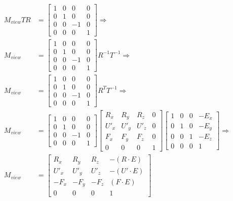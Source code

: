 \begin{equation}
  \begin{aligned}
    M_{view}TR &=   \begin{bmatrix}
      1 & 0 & 0 & 0 \\
      0 & 1 & 0 & 0 \\
      0 & 0 & -1 & 0 \\
      0 & 0 & 0 & 1
      \end{bmatrix}  
      \Rightarrow \\ 
    M_{view} &= \begin{bmatrix}
        1 & 0 & 0 & 0 \\
        0 & 1 & 0 & 0 \\
        0 & 0 & -1 & 0 \\
        0 & 0 & 0 & 1
        \end{bmatrix} R^{-1}T^{-1} 
        \Rightarrow \\ 
    M_{view} &= \begin{bmatrix}
          1 & 0 & 0 & 0 \\
          0 & 1 & 0 & 0 \\
          0 & 0 & -1 & 0 \\
          0 & 0 & 0 & 1
          \end{bmatrix} R^{T}T^{-1} 
          \Rightarrow \\ 
    M_{view} &= \begin{bmatrix}
            1 & 0 & 0 & 0 \\
            0 & 1 & 0 & 0 \\
            0 & 0 & -1 & 0 \\
            0 & 0 & 0 & 1
            \end{bmatrix}  
            \begin{bmatrix}
              R_x & R_y & R_z & 0 \\
              U'_x & U'_y & U'_z & 0 \\
              F_x & F_y & F_z & 0 \\
              0   & 0   & 0   & 1
              \end{bmatrix}  
            \begin{bmatrix}
                1 & 0 & 0 & -E_x \\
                0 & 1 & 0 & -E_y \\
                0 & 0 & 1 & -E_z \\
                0   & 0   & 0   & 1
                \end{bmatrix}  
                \Rightarrow \\ 
    M_{view} &= \begin{bmatrix}
                  R_x & R_y & R_z & -(R \cdot E) \\
                  U'_x & U'_y & U'_z & -(U' \cdot E) \\
                  -F_x & -F_y & -F_z & (F \cdot E) \\
                  0   & 0   & 0   & 1
                  \end{bmatrix}
  \end{aligned}
  \end{equation}

